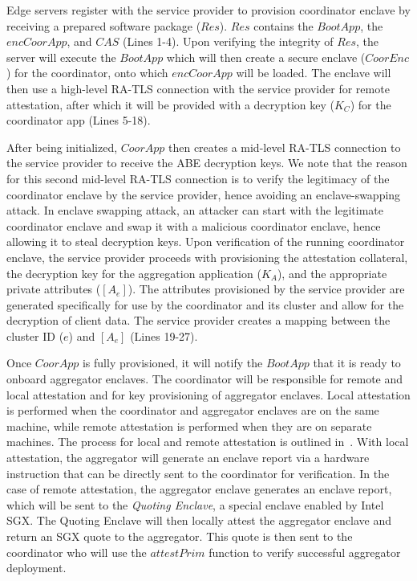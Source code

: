 \noindent
Edge servers register with the service provider to provision coordinator enclave by receiving a prepared software package ($Res$). $Res$ contains the $BootApp$, the $encCoorApp$, and $CAS$ (Lines 1-4). %
Upon verifying the integrity of $Res$, the server will execute the $BootApp$ which will then create a secure enclave ($CoorEnc$) for the coordinator, onto which $encCoorApp$ will be loaded. The enclave will then use a high-level RA-TLS connection with the service provider for remote attestation, after which it will be provided with a decryption key ($K_C$) for the coordinator app (Lines 5-18). 

After being initialized, $CoorApp$ then creates a mid-level RA-TLS connection to the service provider to receive the ABE decryption keys. We note that the reason for this second mid-level RA-TLS connection is to verify the legitimacy of the coordinator enclave by the service provider, hence avoiding an enclave-swapping attack. In enclave swapping attack, an attacker can start with the legitimate coordinator enclave and swap it with a malicious coordinator enclave, hence allowing it to steal decryption keys. %
Upon verification of the running coordinator enclave, the service provider proceeds with provisioning the attestation collateral, the decryption key for the aggregation application ($K_A$), and the appropriate private attributes ($[A_e]$). The attributes provisioned by the service provider are generated specifically for use by the coordinator and its cluster and allow for the decryption of client data. The service provider creates a mapping between the cluster ID ($e$) and $[A_e]$ (Lines 19-27).

Once $CoorApp$ is fully provisioned, it will notify the $BootApp$ that it is ready to onboard aggregator enclaves.
The coordinator will be responsible for remote and local attestation and for key provisioning of aggregator enclaves. Local attestation is performed when the coordinator and aggregator enclaves are on the same machine, while remote attestation is performed when they are on separate machines. The process for local and remote attestation is outlined in~\cite{Anati2013InnovativeTF}. With local attestation, the aggregator will generate an enclave report via a hardware instruction that can be directly sent to the coordinator for verification. In the case of remote attestation, the aggregator enclave generates an enclave report, which will be sent to the {\it Quoting Enclave}, a special enclave enabled by Intel SGX. The Quoting Enclave will then locally attest the aggregator enclave and return an SGX quote to the aggregator. This quote is then sent to the coordinator who will use the $attestPrim$ function to verify successful aggregator deployment.
\bigskip



